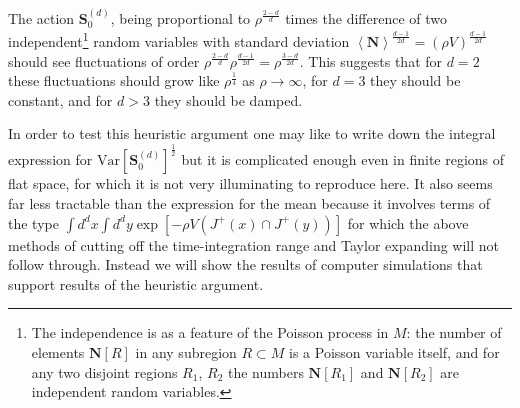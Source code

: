 \documentclass[12pt]{article}
\begin{document}
The action $\textbf{S}^{ (d)}_{0}$, being proportional to $\rho^\frac{2-d}{d}$ times the difference of two independent\footnote{The independence is as a feature of the Poisson process in $M$: the number of elements $\textbf{N}[R]$ in any subregion $R\subset M$ is a Poisson variable itself, and for any two disjoint regions $R_1$, $R_2$ the numbers $\textbf{N}[R_1]$ and $\textbf{N}[R_2]$ are independent random variables.} random variables with standard deviation $\left\langle\textbf{N}\right\rangle^\frac{d-1}{2d} = (\rho V)^\frac{d-1}{2d}$ should see fluctuations of order $\rho^\frac{2-d}{d}\rho^\frac{d-1}{2d}=\rho^\frac{3-d}{2d}$. This suggests that for $d=2$ these fluctuations should grow like $\rho^{\frac{1}{4}}$ as $\rho\rightarrow\infty$, for $d=3$ they should be constant, and for $d>3$ they should be damped.

In order to test this heuristic argument one may like to write down the integral expression for $\text{Var}[\textbf{S}^{ (d)}_0]^\frac12$ but it is complicated enough even in finite regions of flat space, for which it is not very illuminating to reproduce here. It also seems far less tractable than the expression for the mean because it involves terms of the type $\int d^dx\int d^dy \exp\left[-\rho V (J^+ (x)\cap J^+ (y))\right]$ for which the above methods of cutting off the time-integration range and Taylor expanding will not follow through. Instead we will show the results of computer simulations that support results of the heuristic argument. 

\end{document}
